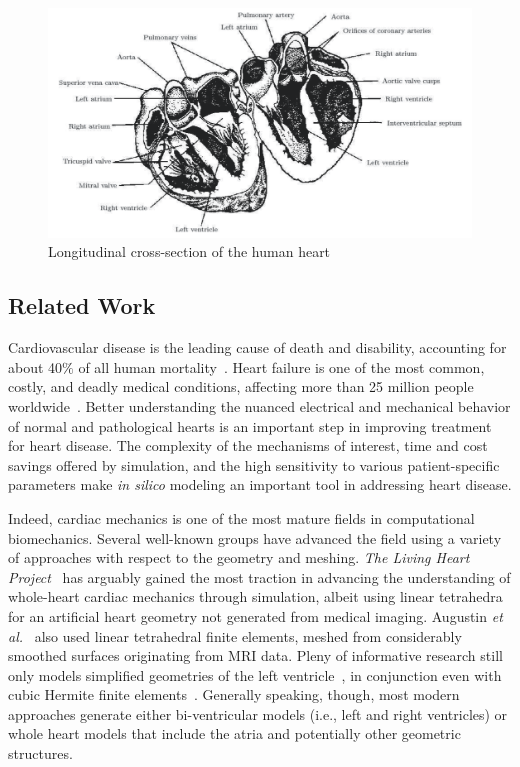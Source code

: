 \begin{figure}[htbp!]
\centering
\includegraphics[width=1.0\textwidth]{media/anatomy.png}
\caption{Longitudinal cross-section of the human heart~\cite{katz_2015}}
\label{fig:anatomy}
\end{figure}

\subsection{Related Work}
Cardiovascular disease is the leading cause of death and disability, accounting for about 40$\%$ of all human mortality~\cite{genet_2015}. Heart failure is one of the most common, costly, and deadly medical conditions, affecting more than 25 million people worldwide~\cite{mann_2015}. Better understanding the nuanced electrical and mechanical behavior of normal and pathological hearts is an important step in improving treatment for heart disease. The complexity of the mechanisms of interest, time and cost savings offered by simulation, and the high sensitivity to various patient-specific parameters make \textit{in silico} modeling an important tool in addressing heart disease.

Indeed, cardiac mechanics is one of the most mature fields in computational biomechanics. Several well-known groups have advanced the field using a variety of approaches with respect to the geometry and meshing. \textit{The Living Heart Project}~\cite{genet_2015, baillargeon_2014} has arguably gained the most traction in advancing the understanding of whole-heart cardiac mechanics through simulation, albeit using linear tetrahedra for an artificial heart geometry not generated from medical imaging. Augustin \textit{et al.}~\cite{augustin_2016} also used linear tetrahedral finite elements, meshed from considerably smoothed surfaces originating from MRI data. Pleny of informative research still only models simplified geometries of the left ventricle~\cite{guccione_2005, sack_2016}, in conjunction even with cubic Hermite finite elements~\cite{mcculloch_2000}. Generally speaking, though, most modern approaches generate either bi-ventricular models (i.e., left and right ventricles) or whole heart models that include the atria and potentially other geometric structures.

